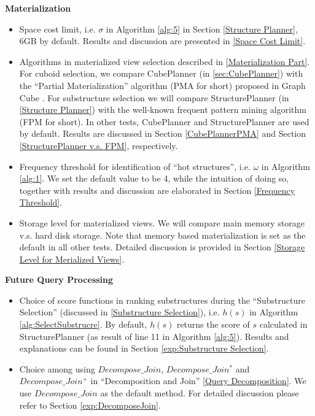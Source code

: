 \textbf{Materialization}
\begin{itemize}
	
	\item  Space cost limit, i.e. $\sigma$ in Algorithm \ref{alg:5} in Section \ref{Structure Planner}, 6GB by default. Results and discussion are presented in \ref{Space Cost Limit}.
	
	\item  Algorithms in materialized view selection described in \ref{Materialization Part}. For cuboid selection, we compare CubePlanner (in \ref{sec:CubePlanner}) with the ``Partial Material{}ization'' algorithm (PMA for short) proposed in Graph Cube \cite{DBLP:conf/sigmod/ZhaoLXH11}. For substructure selection we will compare StructurePlanner (in \ref{Structure Planner}) with the well-known frequent pattern mining algorithm (FPM for short). In other tests, CubePlanner and StructurePlanner are used by default. Results are discussed in Section \ref{CubePlannerPMA} and Section \ref{StructurePlanner v.s. FPM}, respectively.
	
	\item Frequency threshold for identification of “hot structures”, i.e. $\omega$ in Algorithm \ref{alg:1}. We set the default value to be 4, while the intuition of doing so, together with results and discussion are elaborated in Section \ref{Frequency Threshold}.
	
	\item Storage level for materialized views. We will compare main memory storage v.s. hard disk storage. Note that memory based materialization is set as the default in all other tests. Detailed discussion is provided in Section \ref{Storage Level for Merialized Views}.
	
\end{itemize}

\textbf{Future Query Processing}
\begin{itemize}
	\item  Choice of score functions in ranking substructures during the  ``Substructure Selection'' (discussed in \ref{Substructure Selection}), i.e. $h(s)$ in Algorithm \ref{alg:SelectSubstrucre}. By default, $h(s)$ returns the score of $s$ calculated in StructurePlanner (as result of line 11 in Algorithm \ref{alg:5}). Results and explanations can be found in Section \ref{exp:Substructure Selection}.
	
	\item  Choice among using $Decompose\_Join$, $Decompose\_Join^{*}$ and $Decompose\_Join^{+}$ in ``Decomposition and Join'' \ref{Query Decomposition}. We use $Decompose\_Join$ as the default method. For detailed discussion please refer to Section \ref{exp:DecomposeJoin}.
	
\end{itemize}


